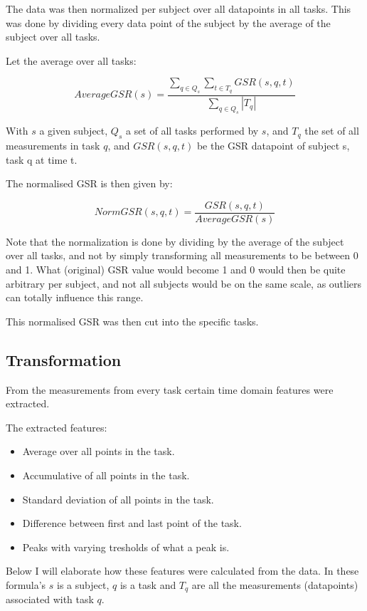 \documentclass[11pt,leqno,a4paper]{report} %
\begin{document}
The data was then normalized per subject over all datapoints in all tasks. This was done by dividing every data point of the subject by the average of the subject over all tasks. 

Let the average over all tasks:


\[
AverageGSR(s) = \frac 
{\sum_{q \in Q_s}\sum_{t \in T_q} GSR(s,q,t)}
{ \sum_{q \in Q_s} \left\vert{T_q}\right\vert }
\]

With $s$ a given subject, $Q_s$ a set of all tasks performed by $s$, and $T_q$ the set of all measurements in task $q$, and $GSR(s,q,t)$ be the GSR datapoint of subject s, task q at time t.

\pagebreak

The normalised GSR is then given by:

\[
NormGSR(s,q,t) = \frac{GSR(s,q,t)}{AverageGSR(s)}
\]

Note that the normalization is done by dividing by the average of the subject over all tasks, and not by simply transforming all measurements to be between 0 and 1. What (original) GSR value would become 1 and 0 would then be quite arbitrary per subject, and not all subjects would be on the same scale, as outliers can totally influence this range.



This normalised GSR was then cut into the specific tasks.

\subsection{Transformation}
From the measurements from every task certain time domain features were extracted. 

The extracted features:

\begin{itemize}

\item Average over all points in the task.
\item Accumulative of all points in the task.
\item Standard deviation of all points in the task.
\item Difference between first and last point of the task.
\item Peaks with varying tresholds of what a peak is.
\end{itemize}

Below I will elaborate how these features were calculated from the data. In these formula's $s$ is a subject, $q$ is a task and $T_q$ are all the measurements (datapoints) associated with task $q$.
\end{document}
